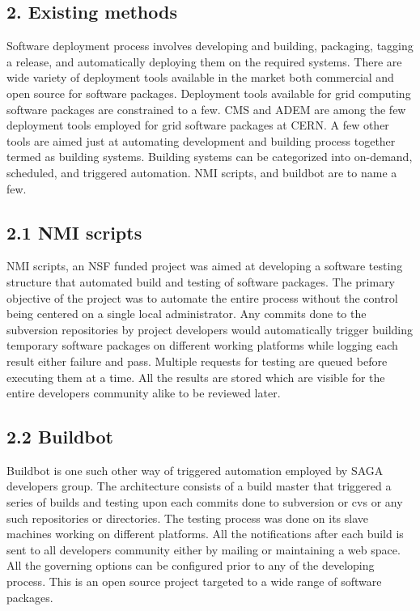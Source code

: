 \documentclass[a4paper,10pt]{article}
\begin{document}
\begin{multicols}{2}
\section*{\normalsize 2. Existing methods}
Software deployment process involves developing and building, packaging, tagging a release, and automatically deploying them on the required systems. 
There are wide variety of deployment tools available in the market both commercial and open source for software packages. Deployment tools available for 
grid computing software packages are constrained to a few. CMS and ADEM are among the few deployment tools employed for grid software packages at CERN. 
A few other tools are aimed just at automating development and building process together termed as building systems. Building systems can be categorized into 
on-demand, scheduled, and triggered automation. NMI scripts, and buildbot are to name a few. 
\subsection*{\normalsize 2.1 NMI scripts} 
NMI scripts, an NSF funded project was aimed at developing a software testing structure that automated build and testing of software packages. 
The primary objective of the project was to automate the entire process without the control being centered on a single local administrator. Any 
commits done to the subversion repositories by project developers would automatically trigger building temporary software packages on different working
platforms while logging each result either failure and pass. Multiple requests for testing are queued before executing them at a time. All the results are 
stored which are visible for the entire developers community alike to be reviewed later. 
\subsection*{\normalsize 2.2 Buildbot}
Buildbot is one such other way of triggered automation employed by SAGA developers group. The architecture consists of a build master that 
triggered a series of builds and testing upon each commits done to subversion or cvs or any such repositories or directories. The testing process 
was done on its slave machines working on different platforms. All the notifications after each build is sent to all developers community either by 
mailing or maintaining a web space. All the governing options can be configured prior to any of the developing process. This is an open source 
project targeted to a wide range of software packages.

\end{multicols}
\end{document}
